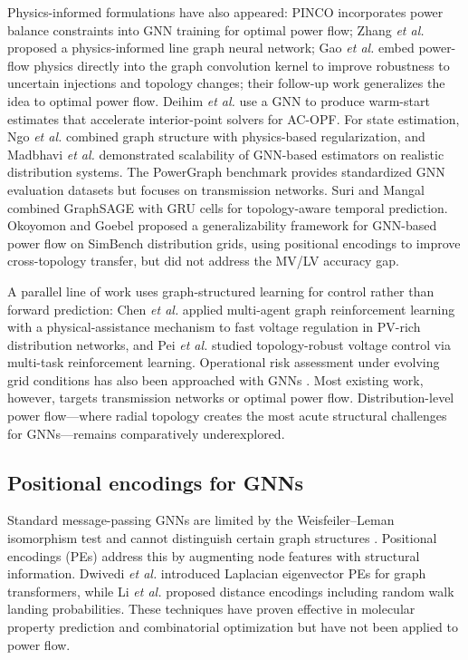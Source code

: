 \documentclass[preprint,review,12pt]{elsarticle}
\begin{document}
Physics-informed formulations have also appeared: PINCO \cite{b7} incorporates power balance constraints into GNN training for optimal power flow; Zhang \emph{et al.} \cite{b8} proposed a physics-informed line graph neural network; Gao \emph{et al.} \cite{b30} embed power-flow physics directly into the graph convolution kernel to improve robustness to uncertain injections and topology changes; their follow-up work \cite{b31} generalizes the idea to optimal power flow. Deihim \emph{et al.} \cite{b32} use a GNN to produce warm-start estimates that accelerate interior-point solvers for AC-OPF. For state estimation, Ngo \emph{et al.} \cite{b26} combined graph structure with physics-based regularization, and Madbhavi \emph{et al.} \cite{b28} demonstrated scalability of GNN-based estimators on realistic distribution systems. The PowerGraph benchmark \cite{b9} provides standardized GNN evaluation datasets but focuses on transmission networks. Suri and Mangal \cite{b11} combined GraphSAGE with GRU cells for topology-aware temporal prediction. Okoyomon and Goebel \cite{b12} proposed a generalizability framework for GNN-based power flow on SimBench distribution grids, using positional encodings to improve cross-topology transfer, but did not address the MV/LV accuracy gap.

A parallel line of work uses graph-structured learning for control rather than forward prediction: Chen \emph{et al.} \cite{b34} applied multi-agent graph reinforcement learning with a physical-assistance mechanism to fast voltage regulation in PV-rich distribution networks, and Pei \emph{et al.} \cite{b35} studied topology-robust voltage control via multi-task reinforcement learning. Operational risk assessment under evolving grid conditions has also been approached with GNNs \cite{b36}. Most existing work, however, targets transmission networks or optimal power flow. Distribution-level power flow---where radial topology creates the most acute structural challenges for GNNs---remains comparatively underexplored.

\subsection{Positional encodings for GNNs}

Standard message-passing GNNs are limited by the Weisfeiler--Leman isomorphism test and cannot distinguish certain graph structures \cite{b13}. Positional encodings (PEs) address this by augmenting node features with structural information. Dwivedi \emph{et al.} \cite{b14} introduced Laplacian eigenvector PEs for graph transformers, while Li \emph{et al.} \cite{b15} proposed distance encodings including random walk landing probabilities. These techniques have proven effective in molecular property prediction and combinatorial optimization but have not been applied to power flow.
\end{document}
